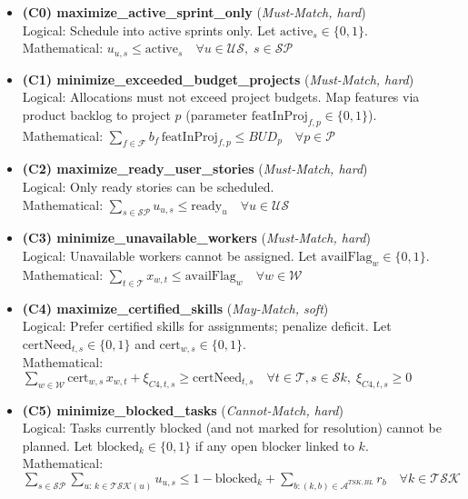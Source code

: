 \documentclass[11pt,a4paper]{article}
\begin{document}
\begin{itemize}[leftmargin=2.2em]

  \item \textbf{(C0) maximize\_active\_sprint\_only} \;(\textit{Must-Match, hard}) \\
  Logical: Schedule into active sprints only. Let $\text{active}_s\in\{0,1\}$. \\
  Mathematical: $\displaystyle u_{u,s} \le \text{active}_s \quad \forall u\in\mathcal{US},\; s\in\mathcal{SP}$

  \item \textbf{(C1) minimize\_exceeded\_budget\_projects} \;(\textit{Must-Match, hard}) \\
  Logical: Allocations must not exceed project budgets. Map features via product backlog to project $p$ (parameter $\text{featInProj}_{f,p}\in\{0,1\}$). \\
  Mathematical: $\displaystyle \sum_{f\in\mathcal{F}} b_f\, \text{featInProj}_{f,p} \le BUD_{p}\quad \forall p\in\mathcal{P}$

  \item \textbf{(C2) maximize\_ready\_user\_stories} \;(\textit{Must-Match, hard}) \\
  Logical: Only ready stories can be scheduled. \\
  Mathematical: $\displaystyle \sum_{s\in\mathcal{SP}} u_{u,s} \le \text{ready}_{u}\quad \forall u\in\mathcal{US}$

  \item \textbf{(C3) minimize\_unavailable\_workers} \;(\textit{Must-Match, hard}) \\
  Logical: Unavailable workers cannot be assigned. Let $\text{availFlag}_w\in\{0,1\}$. \\
  Mathematical: $\displaystyle \sum_{t\in\mathcal{T}} x_{w,t} \le \text{availFlag}_{w}\quad \forall w\in\mathcal{W}$

  \item \textbf{(C4) maximize\_certified\_skills} \;(\textit{May-Match, soft}) \\
  Logical: Prefer certified skills for assignments; penalize deficit. Let $\text{certNeed}_{t,s}\in\{0,1\}$ and $\text{cert}_{w,s}\in\{0,1\}$. \\
  Mathematical: $\displaystyle \sum_{w\in\mathcal{W}} \text{cert}_{w,s}\,x_{w,t} + \xi_{C4,t,s} \ge \text{certNeed}_{t,s}
                 \quad \forall t\in\mathcal{T},s\in\mathcal{S}\!k,\; \xi_{C4,t,s}\ge 0$

  \item \textbf{(C5) minimize\_blocked\_tasks} \;(\textit{Cannot-Match, hard}) \\
  Logical: Tasks currently blocked (and not marked for resolution) cannot be planned. Let $\text{blocked}_{k}\in\{0,1\}$ if any open blocker linked to $k$. \\
  Mathematical: $\displaystyle \sum_{s\in\mathcal{SP}} \sum_{u:\,k\in \mathcal{TSK}(u)} u_{u,s} \le 1-\text{blocked}_{k} + \sum_{b:(k,b)\in\mathcal{A}^{TSK,BL}} r_{b}
                 \quad \forall k\in\mathcal{TSK}$


\end{itemize}
\end{document}
